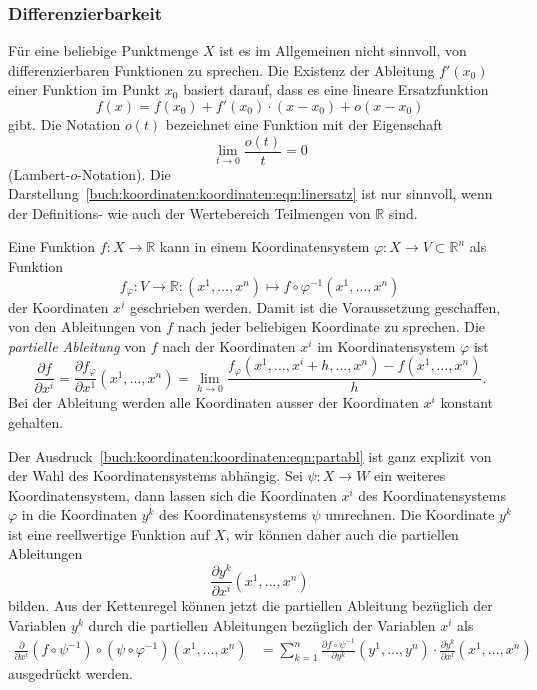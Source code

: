 %
%
\subsubsection{Differenzierbarkeit}
Für eine beliebige Punktmenge $X$ ist es im Allgemeinen nicht sinnvoll,
von differenzierbaren Funktionen zu sprechen.
%
Die Existenz der Ableitung $f'(x_0)$ einer Funktion im Punkt $x_0$
basiert darauf, dass es eine lineare Ersatzfunktion
%
\begin{equation}
f(x) = f(x_0) + f'(x_0)\cdot (x-x_0)+o(x-x_0)
\label{buch:koordinaten:koordinaten:eqn:linersatz}
\end{equation}
gibt.
Die Notation $o(t)$ bezeichnet eine Funktion mit der Eigenschaft
\[
\lim_{t\to 0} \frac{o(t)}{t}=0
\]
(Lambert-$o$-Notation).
%
Die Darstellung~\eqref{buch:koordinaten:koordinaten:eqn:linersatz}
ist nur sinnvoll, wenn der Definitions- wie auch der Wertebereich
Teilmengen von $\mathbb{R}$ sind.

Eine Funktion $f\colon X\to \mathbb{R}$ kann in einem Koordinatensystem
$\varphi\colon X\to V\subset\mathbb{R}^n$ als Funktion
\[
f_\varphi
\colon
V\to\mathbb{R}
:
(x^1,\dots,x^n)
\mapsto
f\circ\varphi^{-1}(x^1,\dots,x^n)
\]
der Koordinaten $x^i$ geschrieben werden.
Damit ist die Voraussetzung geschaffen, von den Ableitungen von $f$
nach jeder beliebigen Koordinate zu sprechen.
Die {\em partielle Ableitung} von $f$ nach der Koordinaten $x^i$ im
Koordinatensystem $\varphi$ ist
\begin{equation}
\frac{\partial f}{\partial x^i}
=
\frac{\partial f_\varphi}{\partial x^1}(x^1,\dots,x^n)
=
\lim_{h\to 0}
\frac{f_\varphi(x^1,\dots,x^i+h,\dots, x^n)-f(x^1,\dots,x^n)}{h}.
\label{buch:koordinaten:koordinaten:eqn:partabl}
\end{equation}
Bei der Ableitung werden alle Koordinaten ausser der Koordinaten $x^i$
konstant gehalten.

Der Ausdruck~\eqref{buch:koordinaten:koordinaten:eqn:partabl} ist ganz
explizit von der Wahl des Koordinatensystems abhängig.
Sei $\psi\colon X\to W$ ein weiteres Koordinatensystem, dann lassen sich
die Koordinaten $x^i$ des Koordinatensystems $\varphi$ in die 
Koordinaten $y^k$ des Koordinatensystems $\psi$ umrechnen.
Die Koordinate $y^k$ ist eine reellwertige Funktion auf $X$, wir
können daher auch die partiellen Ableitungen
\[
\frac{\partial y^k}{\partial x^i}(x^1,\dots,x^n)
\]
bilden.
Aus der Kettenregel können jetzt die partiellen Ableitung bezüglich
%
der Variablen $y^k$ durch die partiellen Ableitungen bezüglich der
Variablen $x^i$ als
\begin{align*}
\frac{\partial}{\partial x^i}
(f\circ\psi^{-1})\circ (\psi\circ\varphi^{-1})(x^1,\dots,x^n)
&=
\sum_{k=1}^n
\frac{\partial f\circ\psi^{-1}}{\partial y^k}(y^1,\dots,y^n)
\cdot
\frac{\partial y^k}{\partial x^i}(x^1,\dots,x^n)
\end{align*}
ausgedrückt werden.

